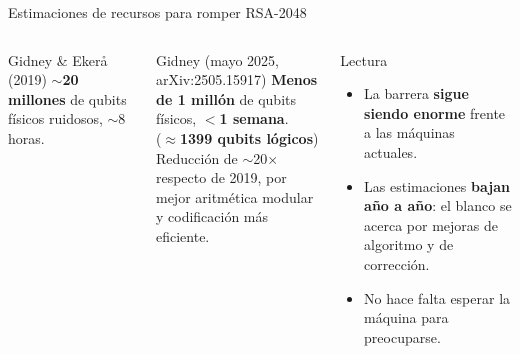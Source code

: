 \documentclass[aspectratio=169]{beamer}
\begin{document}
\begin{frame}{Estimaciones de recursos para romper RSA-2048}
  \begin{columns}[T]
    \begin{block}{Gidney \& Ekerå (2019)}
      \small $\sim$\textbf{20 millones} de qubits físicos ruidosos, $\sim$8 horas.
    \end{block}

    \begin{exampleblock}{Gidney (mayo 2025, arXiv:2505.15917)}
      \small \textbf{Menos de 1 millón} de qubits físicos, \textbf{$<$1 semana}.\\
      ($\approx$\textbf{1399 qubits lógicos})\\[2pt]
      Reducción de $\sim$20$\times$ respecto de 2019, por mejor aritmética
      modular y codificación más eficiente.
    \end{exampleblock}

    \begin{alertblock}{Lectura}
      \small
      \begin{itemize}
        \item La barrera \textbf{sigue siendo enorme} frente a las máquinas
              actuales.
        \item Las estimaciones \textbf{bajan año a año}: el blanco se acerca
              por mejoras de algoritmo y de corrección.
        \item No hace falta esperar la máquina para preocuparse.
      \end{itemize}
    \end{alertblock}
  \end{columns}

\end{frame}
\end{document}
